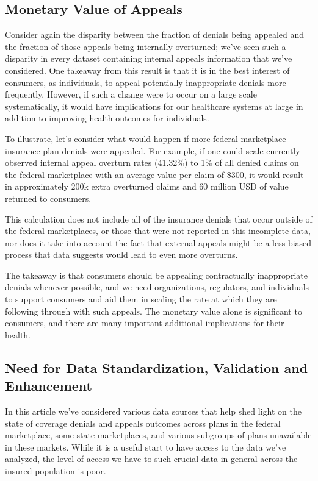 \documentclass[12pt, a4paper,twoside,parskip=full]{report}
\theoremstyle{plain} %
\theoremstyle{definition} %
\theoremstyle{remark} %
\numberwithin{equation}{chapter}
\begin{document}
		\subsection{Monetary Value of Appeals}
		
		Consider again the disparity between the fraction of denials being appealed and the fraction of those appeals being internally overturned; we've seen such a disparity in every dataset containing internal appeals information that we've considered. One takeaway from this result is that it is in the best interest of consumers, as individuals, 
		to appeal potentially inappropriate denials more frequently.  However, if such a change were to occur on a large scale systematically, 
		it would have implications for our healthcare systems at large in addition to improving health
		outcomes for individuals.
		
		To illustrate, let's consider what would happen if more federal marketplace insurance plan denials were appealed. For example, if one could scale currently observed internal appeal overturn rates (41.32\%) to 1\% of all denied claims on the federal marketplace with an average value per claim of \$300, it would result in approximately 200k extra overturned claims and 60 million USD of value returned to consumers.
		
		
		This calculation does not include all of the insurance denials that occur outside of the federal marketplaces, or those that were not reported in
		this incomplete data, nor does it take into account the fact that external appeals might be a less biased process 
		that data suggests would lead to even more overturns.
		
		The takeaway is that consumers should be appealing contractually inappropriate denials whenever possible, and we need organizations, regulators, and individuals to support consumers and aid them in scaling the rate at which they are following through with such appeals. The monetary value alone is significant to consumers, and there are many important additional implications for their health.
		
		\subsection{Need for Data Standardization, Validation and Enhancement}
		
		In this article we've considered various data sources that help shed light on the 
		state of coverage denials and appeals outcomes across plans in the federal marketplace, 
		some state marketplaces, and various subgroups of plans unavailable in these markets. While 
		it is a useful start to have access to the data we've analyzed, the level of access we have 
		to such crucial data in general across the insured population is poor. 
		
\end{document}
